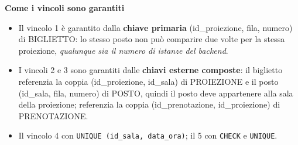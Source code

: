 \textbf{Come i vincoli sono garantiti}
\begin{itemize}
    \item Il vincolo 1 è garantito dalla \textbf{chiave primaria} (id\_proiezione, fila, numero) di BIGLIETTO: lo stesso posto non può comparire due volte per la stessa proiezione, \emph{qualunque sia il numero di istanze del backend}.
    \item I vincoli 2 e 3 sono garantiti dalle \textbf{chiavi esterne composte}: il biglietto referenzia la coppia (id\_proiezione, id\_sala) di PROIEZIONE e il posto (id\_sala, fila, numero) di POSTO, quindi il posto deve appartenere alla sala della proiezione; referenzia la coppia (id\_prenotazione, id\_proiezione) di PRENOTAZIONE.
    \item Il vincolo 4 con \texttt{UNIQUE (id\_sala, data\_ora)}; il 5 con \texttt{CHECK} e \texttt{UNIQUE}.
\end{itemize}

